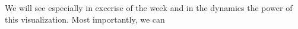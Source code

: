 We will see especially in excerise of the week and in the dynamics the power of this visualization. Most importantly, we can